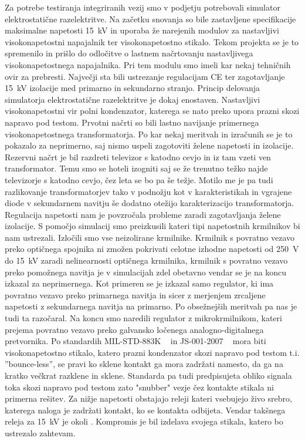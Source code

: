 \documentclass[a4paper,twoside,openright,12pt,Slovene]{book}
\begin{document}
Za potrebe testiranja integriranih vezij smo v podjetju potrebovali simulator elektrostatične razelektritve. Na začetku snovanja so bile zastavljene specifikacije maksimalne napetosti \SI{15}{\kilo\volt} in uporaba že narejenih modulov za nastavljivi visokonapetostni napajalnik ter visokonapetostno stikalo. Tekom projekta se je to spremenilo in prišlo do odločitve o lastnem načrtovanju nastavljivega visokonapetostnega napajalnika. Pri tem modulu smo imeli kar nekaj tehničnih ovir za prebresti. Največji sta bili ustrezanje regulacijam CE ter zagotavljanje \SI{15}{\kilo\volt} izolacije med primarno in sekundarno stranjo.   
Princip delovanja simulatorja elektrostatične razelektritve je dokaj enostaven. Nastavljivi visokonapetostni vir polni kondenzator, katerega se nato preko upora prazni skozi napravo pod testom.    
Prvotni načrti so bili lastno navijanje primernega visokonapetostnega transformatorja. Po kar nekaj meritvah in izračunih se je to pokazalo za neprimerno, saj nismo uspeli zagotoviti želene napetosti in izolacije. Rezervni načrt je bil razdreti televizor s katodno cevjo in iz tam vzeti ven transformator. Temu smo se hoteli izogniti saj se že trenutno težko najde televizorje s katodno cevjo, čez leta se bo pa še težje. Motilo me je pa tudi razlikovanje transformatorjev tako v podnožju kot v karakteristikah in vgrajene diode v sekundarnem navitju še dodatno otežijo karakterizacijo transformatorja. 
Regulacija napetosti nam je povzročala probleme zaradi zagotavljanja želene izolacije. S pomočjo simulacij smo preizkusili kateri tipi napetostnih krmilnikov bi nam ustrezali. Izločili smo vse neizolirane krmilnike. Krmilnik s povratno vezavo preko optičnega spojnika ni zmožen pokrivati celotne izhodne napetosti od \SI{250}{\volt} do \SI{15}{\kilo\volt} zaradi nelinearnosti optičnega krmilnika, krmilnik s povratno vezavo preko pomožnega navitja je v simulacijah zdel obetavno vendar se je na koncu izkazal za neprimernega. Kot primeren se je izkazal samo regulator, ki ima povratno vezavo preko primarnega navitja in sicer z merjenjem zrcaljene napetosti z sekundarnega navitja na primarno. Po obsežnejših meritvah pa nas je tudi ta razočaral. Na koncu smo naredili regulator z mikrokrmilnikom, kateri prejema povratno vezavo preko galvansko ločenega analogno-digitalnega pretvornika.
Po standardih MIL-STD-883K ~\cite{MIL-STD-883K} in JS-001-2007 ~\cite{JS-001-2017} mora biti visokonapetostno stikalo, katero prazni kondenzator skozi napravo pod testom t.i. ''bounce-less'', se pravi ko sklene kontakt ga mora zadržati namesto, da ga na kratko večkrat razklene in sklene. Standarda pa tudi predpisujeta obliko signala toka skozi napravo pod testom zato "snubber" vezje čez kontakte stikala ni primerna rešitev. Za nižje napetosti obstajajo releji kateri vsebujejo živo srebro, katerega naloga je zadržati kontakt, ko se kontakta odbijeta. Vendar takšnega releja za \SI{15}{\kilo\volt} je okoli .
Kompromis je bil izdelava svojega stikala, katero bo ustrezalo zahtevam.
\end{document}
